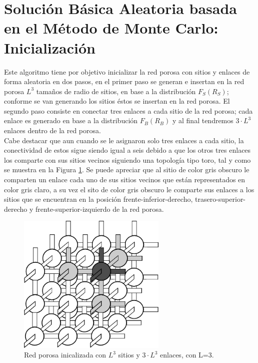 \section{Solución Básica Aleatoria basada en el Método de Monte Carlo: Inicializaci\'on}
\label{sec:smcrg}
Este algoritmo tiene por objetivo inicializar la red porosa con sitios y enlaces de forma aleatoria en dos pasos, en el primer paso 
se generan e insertan en la red porosa $L^3$ tamaños de radio de sitios, en base a la distribución $F_S(R_S)$; conforme se van 
generando los sitios \'estos 
se insertan en la red porosa. El segundo paso consiste en conectar tres enlaces a cada sitio de la red porosa; cada enlace es generado 
en base a la distribución $F_B(R_B)$ y al final tendremos $3 \cdot L^3$ enlaces dentro de la red porosa.\\

Cabe destacar que aun cuando se le asignaron solo tres enlaces a cada sitio, la conectividad de estos sigue siendo igual a seis
 debido a que los otros tres enlaces los comparte con sus sitios vecinos siguiendo una topología tipo toro, tal y como se muestra 
en la Figura \ref{fig:redinit}. Se puede apreciar que al sitio de color gris obscuro le comparten un enlace cada uno de 
sus sitios vecinos que están representados en color gris claro, a su vez el sito de color gris obscuro le comparte sus enlaces 
a los sitios que se encuentran en la posición frente-inferior-derecho, trasero-superior-derecho y frente-superior-izquierdo de la red porosa.


\begin{figure}[hbtp]
\centering
\includegraphics[width=2.8in]{img/red2.pdf}
\caption{Red porosa inicalizada con $L^3$ sitios y $3 \cdot L^3$ enlaces, con L=3.}
\label{fig:redinit}
\end{figure}


